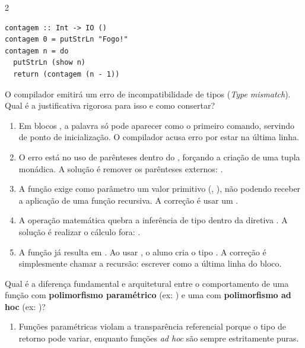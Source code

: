 \documentclass[a4paper,10pt,brazil]{article}
\begin{document}
\begin{multicols}{2}
\begin{verbatim}
contagem :: Int -> IO ()
contagem 0 = putStrLn "Fogo!"
contagem n = do
  putStrLn (show n)
  return (contagem (n - 1))
\end{verbatim}

O compilador emitirá um erro de incompatibilidade de tipos (\emph{Type mismatch}). Qual é a justificativa rigorosa para isso e como consertar?

\begin{enumerate}
  \item Em blocos , a palavra  só pode aparecer como o primeiro comando, servindo de ponto de inicialização. O compilador acusa erro por estar na última linha.

  \item O erro está no uso de parênteses dentro do , forçando a criação de uma tupla monádica. A solução é remover os parênteses externos: .

  \item A função  exige como parâmetro um valor primitivo (, ), não podendo receber a aplicação de uma função recursiva. A correção é usar um .

  \item A operação matemática  quebra a inferência de tipo dentro da diretiva . A solução é realizar o cálculo fora: .
  \item A função  já resulta em . Ao usar , o aluno cria o tipo . A correção é simplesmente chamar a recursão: escrever  como a última linha do bloco.


\end{enumerate}

Qual é a diferença fundamental e arquitetural entre o comportamento de uma função com \textbf{polimorfismo paramétrico} (ex: ) e uma com \textbf{polimorfismo ad hoc} (ex: )?

\begin{enumerate}
  \item Funções paramétricas violam a transparência referencial porque o tipo de retorno pode variar, enquanto funções \emph{ad hoc} são sempre estritamente puras.


\end{enumerate}
\end{multicols}
\end{document}
